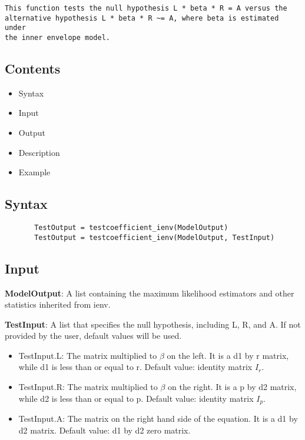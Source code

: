 \documentclass[a4paper,11pt,openany]{memoir}
\begin{document}
\begin{verbatim}This function tests the null hypothesis L * beta * R = A versus the
alternative hypothesis L * beta * R ~= A, where beta is estimated under
the inner envelope model.\end{verbatim}
    
\subsection*{Contents}

\begin{itemize}
\setlength{\itemsep}{-1ex}
   \item Syntax
   \item Input
   \item Output
   \item Description
   \item Example
\end{itemize}


\subsection*{Syntax}


\begin{verbatim}       TestOutput = testcoefficient_ienv(ModelOutput)
       TestOutput = testcoefficient_ienv(ModelOutput, TestInput)\end{verbatim}
    

\subsection*{Input}

\begin{par}
\textbf{ModelOutput}: A list containing the maximum likelihood estimators and other statistics inherited from ienv.
\end{par} \vspace{1em}
\begin{par}
\textbf{TestInput}: A list that specifies the null hypothesis, including L, R, and A.  If not provided by the user, default values will be used.
\end{par} \vspace{1em}
\begin{itemize}
\setlength{\itemsep}{-1ex}
   \item TestInput.L: The matrix multiplied to $\beta$ on the left.  It is a d1 by r matrix, while d1 is less than or equal to r.  Default value: identity matrix $I_r$.
   \item TestInput.R: The matrix multiplied to $\beta$ on the right.  It is a p by d2 matrix, while d2 is less than or equal to p.  Default value: identity matrix $I_p$.
   \item TestInput.A: The matrix on the right hand side of the equation.  It is a d1 by d2 matrix.  Default value: d1 by d2 zero matrix.
\end{itemize}
\end{document}

